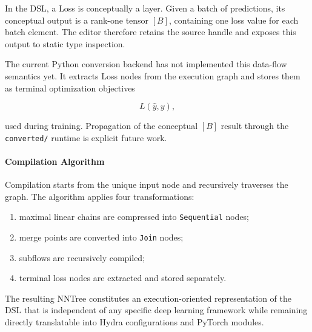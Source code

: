 \documentclass[11pt,a4paper]{article}
\begin{document}
In the DSL, a Loss is conceptually a layer. Given a batch of predictions, its
conceptual output is a rank-one tensor $[B]$, containing one loss value for each
batch element. The editor therefore retains the source handle and exposes this
output to static type inspection.

The current Python conversion backend has not implemented this data-flow
semantics yet. It extracts Loss nodes from the execution graph and stores them
as terminal optimization objectives

\[
	L(\hat{y},y),
\]

used during training. Propagation of the conceptual $[B]$ result through the
\texttt{converted/} runtime is explicit future work.

\paragraph{Compilation Algorithm}

Compilation starts from the unique input node and recursively traverses the graph.
The algorithm applies four transformations:

\begin{enumerate}
	\item maximal linear chains are compressed into \texttt{Sequential} nodes;
	\item merge points are converted into \texttt{Join} nodes;
	\item subflows are recursively compiled;
	\item terminal loss nodes are extracted and stored separately.
\end{enumerate}

The resulting NNTree constitutes an execution-oriented representation of the DSL that is
independent of any specific deep learning framework while remaining directly translatable
into Hydra configurations and PyTorch modules.
\end{document}
